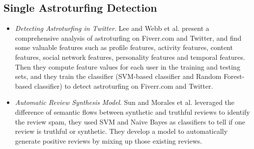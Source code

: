 \documentclass[lettersize,journal]{IEEEtran}
\begin{document}
\subsection{Single Astroturfing Detection}
\begin{itemize}
  \item \emph{Detecting Astroturfing in Twitter}. 
Lee and Webb et al.\cite{Lee2015CharacterizingAA} present a comprehensive analysis of astroturfing on Fiverr.com and Twitter, and find some valuable features such as profile features, activity features, content features, social network features, personality features and temporal features. Then they compute feature values for each user in the training and testing sets, and they train the classifier (SVM-based classifier and Random Forest-based classifier) to detect astroturfing on Fiverr.com and Twitter.

\item \emph{Automatic Review Synthesis Model}.
Sun and Morales et al. \cite{Sun2013SyntheticRS} leveraged the difference of semantic flows between synthetic and truthful reviews to identify the review spam, they used SVM and Naive Bayes as classifiers to tell if one review is truthful or synthetic. They develop a model to automatically generate positive reviews by mixing up those existing reviews.
\end{itemize}
\end{document}
